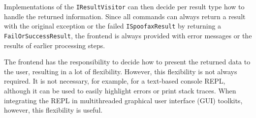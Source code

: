 Implementations of the \texttt{IResultVisitor} can then decide per result type
how to handle the returned information. Since all commands can always return a
result with the original exception or the failed \texttt{ISpoofaxResult} by
returning a \texttt{FailOrSuccessResult}, the frontend is always provided with
error messages or the results of earlier processing steps.

The frontend has the responsibility to decide how to present the returned data
to the user, resulting in a lot of flexibility. However, this flexibility is not
always required. It is not necessary, for example, for a text-based console
REPL, although it can be used to easily highlight errors or print stack
traces. When integrating the REPL in multithreaded graphical user interface
(GUI) toolkits, however, this flexibility is useful.

